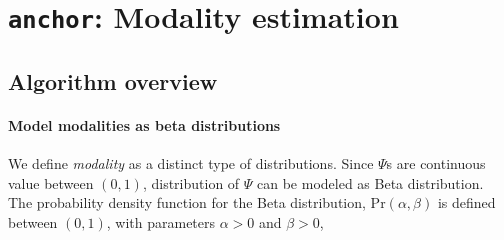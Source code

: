 





\section{\texttt{anchor}: Modality estimation}
\label{sec:anchor}

\subsection{Algorithm overview}
\paragraph{Model modalities as beta distributions}

We define \emph{modality} as a distinct type of distributions. Since $\Psi$s are continuous value between $(0, 1)$, distribution of $\Psi$ can be modeled as Beta distribution. The probability density function for the Beta distribution, $\mathrm{Pr}(\alpha, \beta)$ is defined between $(0, 1)$, with parameters $\alpha > 0$ and $\beta > 0$,

